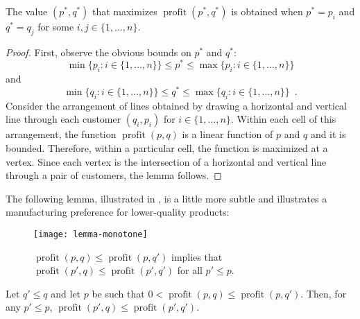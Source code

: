 \documentclass[lotsofwhite]{patmorin}
\newcommand{\val}{\operatorname{profit}}
\begin{document}
\begin{lem}
  The value $(p^*,q^*)$ that maximizes $\val(p^*,q^*)$ is obtained when
  $p^* = p_i$ and $q^*=q_j$ for some $i,j\in\{1,\ldots,n\}$.
\end{lem}

\begin{proof}
  First, observe the obvious bounds on $p^*$ and $q^*$:
  \[
     \min\{p_i:i\in\{1,\ldots,n\}\} \le p^* 
      \le \max\{p_i:i\in\{1,\ldots,n\}\} 
  \] 
  and 
  \[
     \min\{q_i:i\in\{1,\ldots,n\}\} \le q^* 
      \le \max\{q_i:i\in\{1,\ldots,n\}\} \enspace .
  \] 
  Consider the arrangement of lines obtained by drawing a
  horizontal and vertical line through each customer $(q_i,p_i)$
  for $i\in\{1,\ldots,n\}$.  Within each cell of this arrangement,
  the function $\val(p,q)$ is a linear function of $p$ and $q$ and it is
  bounded.  Therefore, within a particular cell, the function is maximized
  at a vertex.  Since each vertex is the intersection of a horizontal
  and vertical line through a pair of customers, the lemma follows.
\end{proof}

The following lemma, illustrated in , is a
little more subtle and illustrates a manufacturing preference for
lower-quality products:
\begin{figure}
  \begin{center}
    \texttt{[image: lemma-monotone]}
  \end{center}
  \caption{$\val(p,q) \le \val(p,q')$ implies that $\val(p',q) \le
           \val(p',q')$ for all $p' \le p$.}
\end{figure}

\begin{lem}
  Let $q' \le q$ and let $p$ be such that $0 < \val(p,q) \le \val(p,q')$.
  Then, for any $p' \le p$, $\val(p',q) \le \val(p',q')$.
\end{lem}
\end{document}

